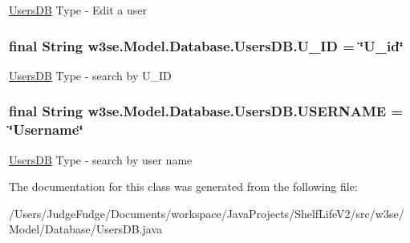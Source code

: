 \hyperlink{classw3se_1_1_model_1_1_database_1_1_users_d_b}{Users\-D\-B} Type -\/ Edit a user \hypertarget{classw3se_1_1_model_1_1_database_1_1_users_d_b_a5795af0f2c38489e3b7ddebc6ef9ec52}{
\subsubsection[{U\-\_\-\-I\-D}]{\setlength{\rightskip}{0pt plus 5cm}final String w3se.\-Model.\-Database.\-Users\-D\-B.\-U\-\_\-\-I\-D = \char`\"{}U\-\_\-id\char`\"{}\hspace{0.3cm}{\ttfamily [static]}}}\label{classw3se_1_1_model_1_1_database_1_1_users_d_b_a5795af0f2c38489e3b7ddebc6ef9ec52}
\hyperlink{classw3se_1_1_model_1_1_database_1_1_users_d_b}{Users\-D\-B} Type -\/ search by U\-\_\-\-I\-D \hypertarget{classw3se_1_1_model_1_1_database_1_1_users_d_b_a4f59ead92730d8f63bca2e6c3234486a}{
\subsubsection[{U\-S\-E\-R\-N\-A\-M\-E}]{\setlength{\rightskip}{0pt plus 5cm}final String w3se.\-Model.\-Database.\-Users\-D\-B.\-U\-S\-E\-R\-N\-A\-M\-E = \char`\"{}Username\char`\"{}\hspace{0.3cm}{\ttfamily [static]}}}\label{classw3se_1_1_model_1_1_database_1_1_users_d_b_a4f59ead92730d8f63bca2e6c3234486a}
\hyperlink{classw3se_1_1_model_1_1_database_1_1_users_d_b}{Users\-D\-B} Type -\/ search by user name 

The documentation for this class was generated from the following file\-:\begin{DoxyCompactItemize}
\item 
/\-Users/\-Judge\-Fudge/\-Documents/workspace/\-Java\-Projects/\-Shelf\-Life\-V2/src/w3se/\-Model/\-Database/Users\-D\-B.\-java\end{DoxyCompactItemize}
